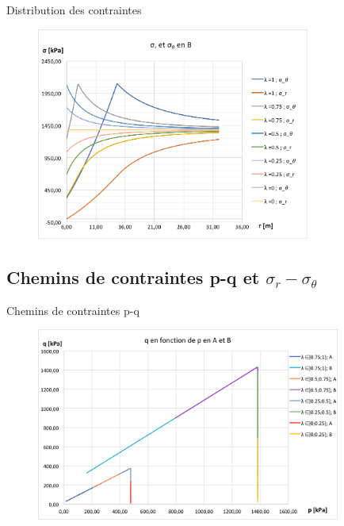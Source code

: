 \documentclass{beamer}
\begin{document}
\begin{frame}{Distribution des contraintes}

\begin{figure}
\centering
\includegraphics[width=9cm]{sig_B2.png}
\end{figure}
    
\end{frame}











\subsection{Chemins de contraintes p-q et $\sigma_r - \sigma_{\theta}$}


\begin{frame}{Chemins de contraintes p-q}

\begin{figure}
\centering
\includegraphics[width=10cm]{pq2.png}
\end{figure}
    
\end{frame}
\end{document}
